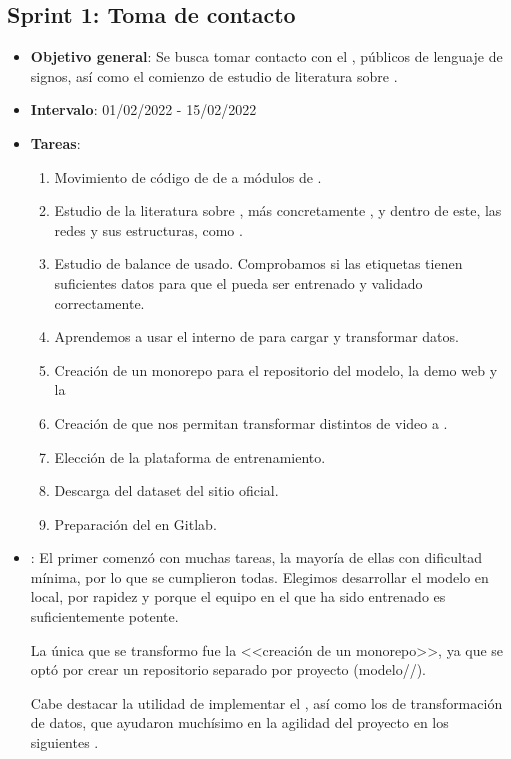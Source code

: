 \subsection{Sprint 1: Toma de contacto}

\begin{itemize}
  \item  \textbf{Objetivo general}: Se busca tomar contacto con el  ,  públicos de lenguaje de signos, así como el comienzo de estudio de literatura sobre .

  \item \textbf{Intervalo}: 01/02/2022 - 15/02/2022

  \item \textbf{Tareas}:
        \begin{enumerate}
          \item Movimiento de código de  de  a módulos de .
          \item Estudio de la literatura sobre , más concretamente , y dentro de este, las redes  y sus estructuras, como .
          \item Estudio de balance de  usado. Comprobamos si las etiquetas tienen suficientes datos para que el  pueda ser entrenado y validado correctamente.
          \item Aprendemos a usar el  interno de  para cargar y transformar datos.
          \item Creación de un monorepo para el repositorio del modelo, la demo web y la 
          \item Creación de  que nos permitan transformar distintos  de video a .
          \item Elección de la plataforma de entrenamiento.
          \item Descarga del dataset del sitio oficial.
          \item Preparación del  en Gitlab.
        \end{enumerate}

  \item \textbf{}: El primer  comenzó con muchas tareas, la mayoría de ellas con dificultad mínima, por lo que se cumplieron todas. Elegimos desarrollar el modelo en local, por rapidez y porque el equipo en el que ha sido entrenado es suficientemente potente.

        La única  que se transformo fue la <<creación de un monorepo>>, ya que se optó por crear un repositorio separado por proyecto (modelo//).

        Cabe destacar la utilidad de implementar el , así como los  de transformación de datos, que ayudaron muchísimo en la agilidad del proyecto en los siguientes .
\end{itemize}

